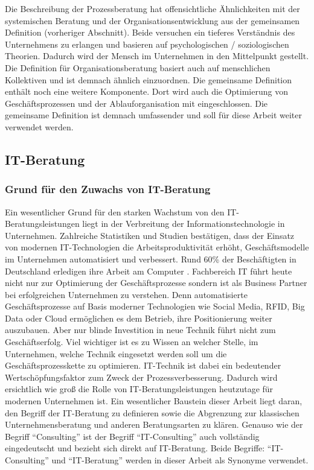 Die Beschreibung der Prozessberatung hat offensichtliche Ähnlichkeiten mit der systemischen Beratung und der Organisationsentwicklung aus der gemeinsamen Definition (vorheriger Abschnitt). Beide versuchen ein tieferes Verständnis des Unternehmens zu erlangen und basieren auf psychologischen / soziologischen Theorien. Dadurch wird der Mensch im Unternehmen in den Mittelpunkt gestellt.
Die Definition für Organisationsberatung basiert auch auf \grqq menschlichen Kollektiven \glqq und ist demnach ähnlich einzuordnen.
Die gemeinsame Definition enthält noch eine weitere Komponente. Dort wird auch die Optimierung von Geschäftsprozessen und der Ablauforganisation mit eingeschlossen. Die gemeinsame Definition ist demnach umfassender und soll für diese Arbeit weiter verwendet werden. 


\subsection{IT-Beratung}
	\subsubsection{Grund für den Zuwachs von IT-Beratung}
	
		Ein wesentlicher Grund für den starken Wachstum von den IT-Beratungsleistungen liegt in der Verbreitung der Informationstechnologie in Unternehmen. Zahlreiche Statistiken und Studien bestätigen, dass der Einsatz von modernen IT-Technologien die Arbeitsproduktivität erhöht, Geschäftsmodelle im Unternehmen automatisiert und verbessert. Rund 60\% der Beschäftigten in Deutschland  erledigen ihre Arbeit am Computer \cite{IreneBertschek.2011}.
		Fachbereich IT führt heute nicht nur zur Optimierung der Geschäftsprozesse sondern ist als Business Partner bei erfolgreichen Unternehmen zu verstehen. Denn automatisierte Geschäftsprozesse auf Basis moderner Technologien wie Social Media, RFID, Big Data oder Cloud  ermöglichen es dem Betrieb, ihre Positionierung weiter auszubauen.
		Aber nur blinde Investition in neue Technik führt nicht zum Geschäftserfolg. Viel wichtiger ist es zu Wissen an welcher Stelle, im Unternehmen, welche Technik eingesetzt werden soll um die Geschäftsprozesskette zu optimieren. IT-Technik ist dabei ein bedeutender Wertschöpfungsfaktor zum Zweck der Prozessverbesserung.
		Dadurch wird ersichtlich wie groß die Rolle von IT-Beratungsleistungen heutzutage  für modernen Unternehmen ist. Ein wesentlicher Baustein dieser Arbeit liegt daran, den Begriff der IT-Beratung  zu definieren sowie die Abgrenzung zur klassischen Unternehmensberatung und anderen Beratungsarten  zu klären.
		Genauso wie der Begriff “Consulting” ist der Begriff “IT-Consulting” auch vollständig eingedeutscht und bezieht sich direkt auf IT-Beratung. Beide Begriffe: “IT-Consulting” und “IT-Beratung” werden in dieser Arbeit als Synonyme verwendet.\\
